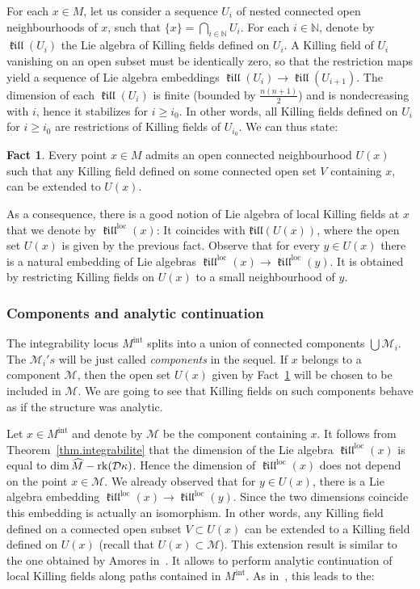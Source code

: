 \documentclass[11pt]{article}
\theoremstyle{definition}
\numberwithin{equation}{section}
\numberwithin{figure}{section}
\numberwithin{table}{section}
\newtheorem{fact}[theo]{Fact} }
\DeclareMathOperator{\rk}{rk}
\DeclareMathOperator{\loc}{loc}
\newcommand{\mint}{{M^{\intl}}}
\DeclareMathOperator{\intl}{int}
\DeclareMathOperator{\kil}{{\mathfrak{kill}}}
\newcommand{\kiloc}{\kil^{\loc}}
\newcommand{\calm}{\mathcal{M}}
\newcommand*\dk{{\mathcal{D}\kappa}}
\newcommand*\NN{\mathbb{N}}
\newcommand{\hm}{{\hat{M}}}
\let\oldhat\hat
\renewcommand*\hat[1]{\mathchoice{\widehat{#1}}{\widehat{#1}}{\widehat{#1}}{\oldhat{#1}}}
\begin{document}
For each $x \in M$, let us consider a sequence $U_i$ of nested connected open neighbourhoods of $x$, such that $\{ x \}=\bigcap_{i \in \NN}U_i$. For each $i \in \NN$, denote by $\kil(U_i)$ the Lie algebra of Killing fields defined on $U_i$. A Killing field of $U_i$ vanishing on an open subset must be identically zero, so that the restriction maps yield a sequence of Lie algebra embeddings $\kil(U_i) \to \kil(U_{i+1})$. The dimension of each $\kil(U_i)$ is finite (bounded by $\frac{n(n+1)}{2}$) and is nondecreasing with $i$, hence it stabilizes for $i \geq i_0$. In other words, all Killing fields defined on $U_i$ for $i \geq i_0$ are restrictions of Killing fields of $U_{i_0}$. We can thus state:
\begin{fact}\label{fact.extension}
Every point $x \in M$ admits an open connected neighbourhood $U(x)$ such that any Killing field defined on some connected open set $V$ containing $x$, can be extended to $U(x)$.
\end{fact}

As a consequence, there is a good notion of Lie algebra of local Killing fields at $x$ that we denote by $\kiloc(x)$: It coincides with $\mathfrak{kill}(U(x))$, where the open set $U(x)$ is given by the previous fact. Observe that for every $y \in U(x)$ there is a natural embedding of Lie algebras $\kiloc(x) \to \kiloc(y)$. It is obtained by restricting Killing fields on $U(x)$ to a small neighbourhood of $y$.


\subsubsection{Components and analytic continuation}\label{sec.analytic}
The integrability locus $\mint$ splits into a union of connected components $\bigcup {\mathcal M}_i$. The ${\mathcal M}_i's$ will be just called \emph{components} in the sequel. If $x$ belongs to a component $\calm$, then the open set $U(x)$ given by Fact~\ref{fact.extension} will be chosen to be included in $\calm$. We are going to see that Killing fields on such components behave as if the structure was analytic.


Let $x \in \mint$ and denote by $\calm$ be the component containing $x$. It follows from Theorem~\ref{thm.integrabilite} that the dimension of the Lie algebra $\kiloc(x)$ is equal to $\dim \hm - \rk(\dk)$. Hence the dimension of $\kiloc(x)$ does not depend on the point $x \in \calm$. We already observed that for $y \in U(x)$, there is a Lie algebra embedding $\kiloc(x) \to \kiloc(y)$. Since the two dimensions coincide this embedding is actually an isomorphism. In other words, any Killing field defined on a connected open subset $V \subset U(x)$ can be extended to a Killing field defined on $U(x)$ (recall that $U(x) \subset \calm$). This extension result is similar to the one obtained by Amores in~\cite{amores}. It allows to perform analytic continuation of local Killing fields along paths contained in $\mint$. As in~\cite{amores}, this leads to the:
\end{document}
